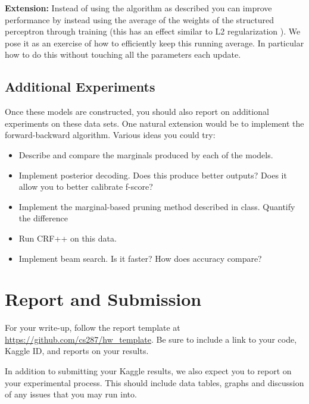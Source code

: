 \documentclass[11pt]{article}
\begin{document}
\textbf{Extension:} Instead of using the algorithm as described you
can improve performance by instead using the average of the weights of
the structured perceptron through training (this has an effect similar
to L2 regularization \cite{}). We pose it as an exercise of how to efficiently 
keep this running average. In particular how to do this without touching 
all the parameters each update. 

\subsection{Additional Experiments}

Once these models are constructed, you should also report on
additional experiments on these data sets. One natural extension 
would be to implement the forward-backward algorithm. Various 
ideas you could try:

\begin{itemize}
\item Describe and compare the marginals produced by each of the models. 
\item Implement posterior decoding. Does this produce better outputs? Does it allow you to better calibrate f-score?
\item Implement the marginal-based pruning method described in class. Quantify the difference
\item Run CRF++ on this data. 
\item Implement beam search. Is it faster? How does accuracy compare?
\end{itemize}

\section{Report and Submission}

For your write-up, follow the report template at
\url{https://github.com/cs287/hw_template}. Be sure to include a link
to your code, Kaggle ID, and reports on your results.

In addition to submitting your Kaggle results, we also expect you to report on your 
experimental process. This should include data tables, graphs and discussion of any 
issues that you may run into. 

 

\end{document}
